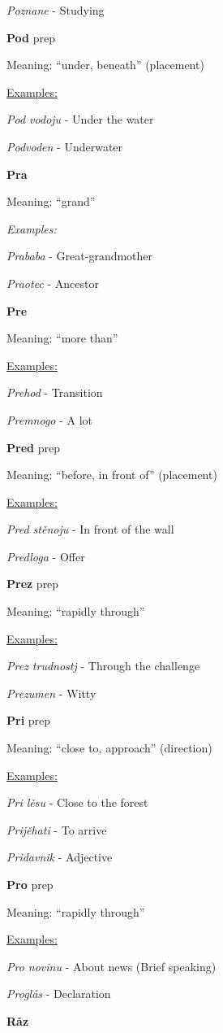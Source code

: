 \textit{Poznane} - Studying

\textbf{Pod} \gls{prep}

Meaning: “under, beneath” (placement)

\underline{Examples:}

\textit{Pod vodoju} - Under the water

\textit{Podvoden} - Underwater

\textbf{Pra}

Meaning: “grand”

\textit{Examples:}

\textit{Prababa} - Great-grandmother

\textit{Praotec} - Ancestor

\textbf{Pre}

Meaning: “more than”

\underline{Examples:}

\textit{Prehod} - Transition

\textit{Premnogo} - A lot

\textbf{Pred} \gls{prep}

Meaning: “before, in front of” (placement)

\underline{Examples:}

\textit{Pred stěnoju} - In front of the wall

\textit{Predloga} - Offer

\textbf{Prez} \gls{prep}

Meaning: “rapidly through”

\underline{Examples:}

\textit{Prez trudnostj} - Through the challenge

\textit{Prezumen} - Witty

\textbf{Pri} \gls{prep}

Meaning: “close to, approach” (direction)

\underline{Examples:}

\textit{Pri lěsu} - Close to the forest

\textit{Prijěhati} - To arrive

\textit{Pridavnik} - Adjective

\textbf{Pro} \gls{prep}

Meaning: “rapidly through”

\underline{Examples:}

\textit{Pro novinu} - About news (Brief speaking)

\textit{Proglås} - Declaration

\textbf{Råz}

